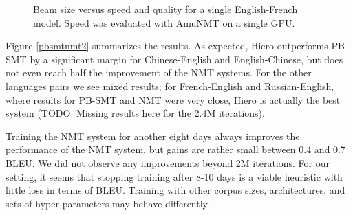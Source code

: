 \documentclass[11pt]{article}
\begin{document}
\begin{figure*}[t]
\centering
\begin{subfigure}[t]{0.7\textwidth}
\end{subfigure}
\caption{Beam size versus speed and quality for a single English-French model. Speed was evaluated with AmuNMT on a single GPU.}\label{beam}
\end{figure*}

Figure \ref{pbsmtnmt2} summarizes the results. As expected, Hiero outperforms PB-SMT by a significant margin for Chinese-English and English-Chinese, but does not even reach half the improvement of the NMT systems. For the other languages pairs we see mixed results; for French-English and Russian-English, where results for PB-SMT and NMT were very close, Hiero is actually the best system (TODO: Missing results here for the 2.4M iterations).

Training the NMT system for another eight days always improves the performance of the NMT system, but gains are rather small between 0.4 and 0.7 BLEU. We did not observe any improvements beyond 2M iterations. For our setting, it seems that stopping training after 8-10 days is a viable heuristic with little loss in terms of BLEU. Training with other corpus sizes, architectures, and sets of hyper-parameters may behave differently.
\end{document}
